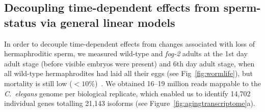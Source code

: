 \documentclass[10pt,letterpaper,twocolumn]{article}
\newcommand{\cel}{\emph{C.~elegans}}
\newcommand{\fog}{\emph{\mbox{fog-2}}}
\begin{document}
\subsection*{Decoupling time-dependent effects from sperm-status via general
linear models}
\label{sub:Transcriptomics}
In order to decouple time-dependent effects from changes associated with loss
of hermaphroditic sperm, we measured wild-type and \fog{} adults at the 1st day
adult stage (before visible embryos were present) and 6th day adult stage, when
all wild-type hermaphrodites had laid all their eggs (see
Fig~\ref{fig:wormlife}), but mortality is still low
($<10\%$)~\cite{Stroustrup2013}.  We obtained 16--19 million reads mappable to
the \cel{} genome per biological replicate, which enabled us to identify
14,702 individual genes totalling 21,143 isoforms (see
Figure~\ref{fig:agingtranscriptome}a).
\end{document}
